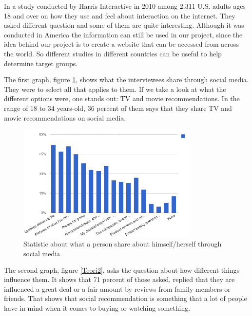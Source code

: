 In a study conducted by Harris Interactive \cite{Harris} in 2010 among 2.311 U.S. adults ages 18 and over on how they use and feel about interaction on the internet. They asked different question and some of them are quite interesting.
Although it was conducted in America the information can still be used in our project, since the idea behind our project is to create a website that can be accessed from across the world. So different studies in different countries can be useful to help determine target groups.

The first graph, figure \ref{Teori1}, shows what the interviewees share through social media. They were to select all that applies to them. If we take a look at what the different options were, one stands out: TV and movie recommendations. In the range of 18 to 34 years-old, 36 percent of them says that they share TV and movie recommendations on social media.

\begin{figure}[H]
\centering
\includegraphics[width=0.8\textwidth]{Images/teori1.png}
\caption{Statistic about what a person share about himself/herself through social media}
\label{Teori1}
\end{figure}


The second graph, figure \ref{Teori2}, asks the question about how different things influence them. It shows that 71 percent of those asked, replied that they are influenced a great deal or a fair amount by reviews from family members or friends. That shows that social recommendation is something that a lot of people have in mind when it comes to buying or watching something.

